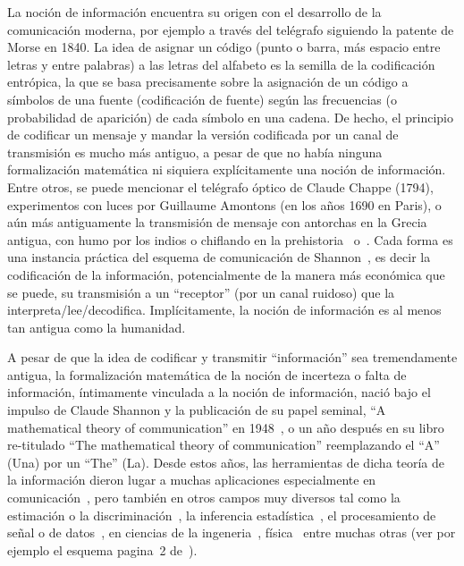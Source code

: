 \label{s:SZ:Introduccion}

La  noci\'on  de informaci\'on  encuentra  su origen  con  el  desarrollo de  la
comunicaci\'on  moderna, por  ejemplo a  trav\'es del  tel\'egrafo  siguiendo la
patente de Morse en  1840. La idea de asignar un c\'odigo  (punto o barra, m\'as
espacio entre letras  y entre palabras) a las letras del  alfabeto es la semilla
de  la  codificaci\'on  entr\'opica,  la  que  se  basa  precisamente  sobre  la
asignaci\'on  de un  c\'odigo  a  s\'imbolos de  una  fuente (codificaci\'on  de
fuente)  seg\'un  las  frecuencias  (o  probabilidad  de  aparici\'on)  de  cada
s\'imbolo  en una  cadena.  De  hecho, el  principio de  codificar un  mensaje y
mandar  la versi\'on codificada  por un  canal de  transmisi\'on es  mucho m\'as
antiguo,  a pesar  de que  no  hab\'ia ninguna  formalizaci\'on matem\'atica  ni
siquiera expl\'icitamente una noci\'on  de informaci\'on.  Entre otros, se puede
mencionar  el tel\'egrafo  \'optico de  Claude Chappe  (1794),  experimentos con
luces  por Guillaume  Amontons (en  los  a\~nos 1690  en Paris),  o a\'un  m\'as
antiguamente la transmisi\'on de mensaje con antorchas en la Grecia antigua, con
humo   por    los   indios   o   chiflando    en   la   prehistoria~\cite{Mon08}
o~\cite[Cap.~3]{Arn01}.  Cada  forma es una instancia pr\'actica  del esquema de
comunicaci\'on de Shannon~\cite{Sha48, ShaWea64},  es decir la codificaci\'on de
la informaci\'on, potencialmente de la manera m\'as econ\'omica que se puede, su
transmisi\'on   a   un   ``receptor''    (por   un   canal   ruidoso)   que   la
interpreta/lee/decodifica.  Impl\'icitamente, la noci\'on de informaci\'on es al
menos tan antigua como la humanidad.

A  pesar  de  que  la  idea  de codificar  y  transmitir  ``informaci\'on''  sea
tremendamente  antigua,  la  formalizaci\'on  matem\'atica  de  la  noci\'on  de
incerteza o  falta de  informaci\'on, \'intimamente vinculada  a la  noci\'on de
informaci\'on, naci\'o bajo  el impulso de Claude Shannon  y la publicaci\'on de
su   papel   seminal,   ``A    mathematical   theory   of   communication''   en
1948~\cite{Sha48},  o   un  a\~no  despu\'es  en  su   libro  re-titulado  ``The
mathematical  theory  of communication''  reemplazando  el  ``A''  (Una) por  un
``The''  (La). Desde  estos a\~nos,  las herramientas  de dicha  teor\'ia  de la
informaci\'on   dieron   lugar    a   muchas   aplicaciones   especialmente   en
comunicaci\'on~\cite[y  ref.]{CovTho06, Ver98, Gal01},  pero tambi\'en  en otros
campos  muy diversos  tal  como la  estimaci\'on  o la  discriminaci\'on~\cite[y
ref.]{CovTho06,      Kay93,       Bos07,      LehCas98},      la      inferencia
estad\'istica~\cite{Rob07,   Par06},   el   procesamiento   de  se\~nal   o   de
datos~\cite[y   Ref.]{PhiRou92,   EbeMol00,    Bas13},   en   ciencias   de   la
ingeneria~\cite{Arn01, Kap89, KapKes92, PhiRou92}, f\'isica~\cite[y Ref.]{Arn01,
OhyPet93,  Mer18}  entre muchas  otras  (ver  por  ejemplo el  esquema  pagina~2
de~\cite{CovTho06}).

